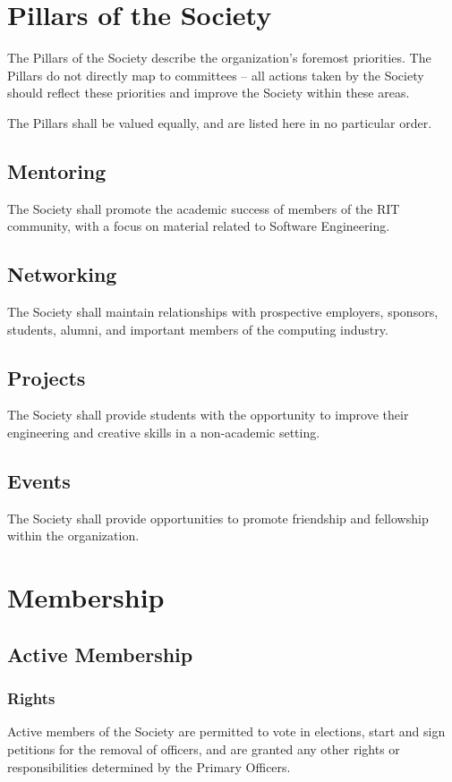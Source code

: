\documentclass[american]{article}
\begin{document}
\section{Pillars of the Society}

The Pillars of the Society describe the organization's foremost priorities. The Pillars do not directly map to committees -- all actions taken by the Society should reflect these priorities and improve the Society within these areas.

The Pillars shall be valued equally, and are listed here in no particular order.

\subsection{Mentoring}
The Society shall promote the academic success of members of the RIT community, with a focus on material related to Software Engineering.

\subsection{Networking}
The Society shall maintain relationships with prospective employers, sponsors, students, alumni, and important members of the computing industry.

\subsection{Projects}
The Society shall provide students with the opportunity to improve their engineering and creative skills in a non-academic setting.

\subsection{Events}
The Society shall provide opportunities to promote friendship and fellowship within the organization.

\section{Membership}

\subsection{Active Membership}

\subsubsection{Rights}
Active members of the Society are permitted to vote in elections, start and sign petitions for the removal of officers, and are granted any other rights or responsibilities determined by the Primary Officers.
\end{document}
